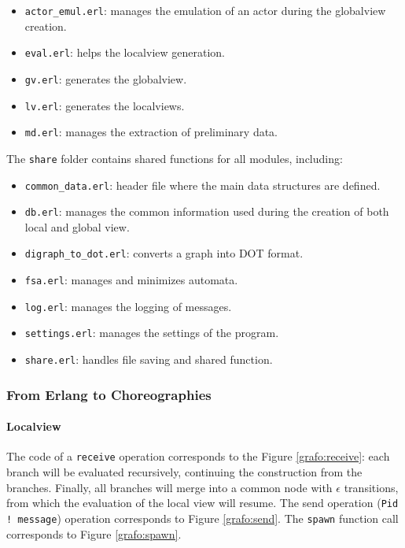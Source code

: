 \begin{itemize}  
    \item \texttt{actor\_emul.erl}: manages the emulation of an actor during the
    globalview creation.
    \item \texttt{eval.erl}: helps the localview generation.  
    \item \texttt{gv.erl}: generates the globalview.  
    \item \texttt{lv.erl}: generates the localviews.  
    \item \texttt{md.erl}: manages the extraction of preliminary data.  
\end{itemize}  

\noindent The \texttt{share} folder contains shared functions for all modules,
including:  
\begin{itemize}  
  \item \texttt{common\_data.erl}: header file where the main data structures
  are defined.  
  \item \texttt{db.erl}: manages the common information used during the creation
  of both local and global view.  
  \item \texttt{digraph\_to\_dot.erl}: converts a graph into DOT format.  
  \item \texttt{fsa.erl}: manages and minimizes automata.  
  \item \texttt{log.erl}: manages the logging of messages.  
  \item \texttt{settings.erl}: manages the settings of the program.  
  \item \texttt{share.erl}: handles file saving and shared function.  
\end{itemize}

\subsubsection{From Erlang to Choreographies}
\label{sec:corrisp}

\paragraph{Localview}

The code of a \texttt{receive} operation corresponds to the Figure \ref{grafo:receive}:
each branch will be evaluated recursively, continuing the construction from the 
branches. Finally, all branches will merge into a common node with $\epsilon$ 
transitions, from which the evaluation of the local view will resume.  
The send operation (\texttt{Pid ! message}) operation corresponds to Figure \ref{grafo:send}.  
The \texttt{spawn} function call corresponds to Figure \ref{grafo:spawn}.  

